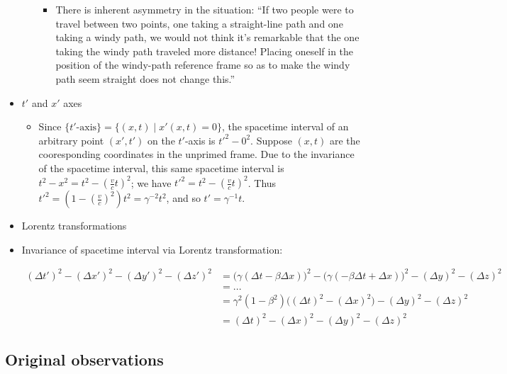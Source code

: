 \documentclass{article}
\begin{document}
\begin{itemize}
\begin{itemize}
\begin{itemize}
            \item There is inherent asymmetry in the situation: ``If two people were to travel between two points, one taking a straight-line path and one taking a windy path, we would not think it's remarkable that the one taking the windy path traveled more distance! Placing oneself in the position of the windy-path reference frame so as to make the windy path seem straight does not change this.''
        \end{itemize}
    \end{itemize}
    \item $t'$ and $x'$ axes
    \begin{itemize}
        \item Since $\{\text{$t'$-axis}\} = \{(x, t) \mid x'(x, t) = 0\}$, the spacetime interval of an arbitrary point $(x', t')$ on the $t'$-axis is $t'^2 - 0^2$. Suppose $(x, t)$ are the cooresponding coordinates in the unprimed frame. Due to the invariance of the spacetime interval, this same spacetime interval is $t^2 - x^2 = t^2 - (\frac{v}{c}t)^2$; we have $t'^2 = t^2 - (\frac{v}{c}t)^2$. Thus $t'^2 = (1 - (\frac{v}{c})^2)t^2 = \gamma^{-2} t^2$, and so $t' = \gamma^{-1} t$.        
    \end{itemize}
    \item Lorentz transformations
    \item Invariance of spacetime interval via Lorentz transformation:
    \begin{itemize}
        \begin{align*}
            (\Delta t')^2 - (\Delta x')^2 - (\Delta y')^2 - (\Delta z')^2
            &= \Big(\gamma(\Delta t - \beta \Delta x)\Big)^2 - \Big(\gamma(-\beta \Delta t + \Delta x)\Big)^2 - (\Delta y)^2 - (\Delta z)^2 \\
            &= ... \\
            &= \gamma^2 (1 - \beta^2)\Big((\Delta t)^2 - (\Delta x)^2\Big) - (\Delta y)^2 - (\Delta z)^2 \\
            &= (\Delta t)^2 - (\Delta x)^2 - (\Delta y)^2 - (\Delta z)^2 
        \end{align*}
    \end{itemize}
\end{itemize}

\subsection*{Original observations}
\end{document}
